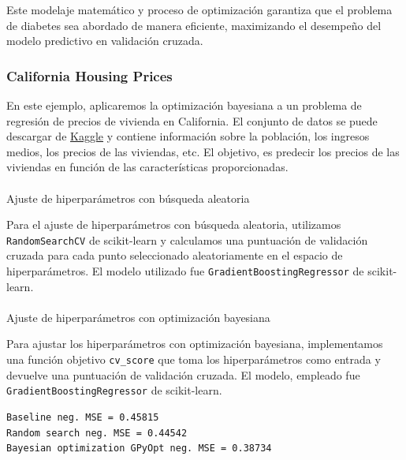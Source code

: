 \documentclass[
  12pt,
  letterpaper,
  DIV=11,
  numbers=noendperiod]{scrartcl}
\makeatletter
\let\oldparagraph\paragraph
\renewcommand{\paragraph}{
    \@ifstar
      \xxxParagraphStar
      \xxxParagraphNoStar
  }
\newcommand{\xxxParagraphStar}[1]{\oldparagraph*{#1}\mbox{}}
\newcommand{\xxxParagraphNoStar}[1]{\oldparagraph{#1}\mbox{}}
\makeatother
\begin{document}
Este modelaje matemático y proceso de optimización garantiza que el
problema de diabetes sea abordado de manera eficiente, maximizando el
desempeño del modelo predictivo en validación cruzada.

\subsubsection{California Housing
Prices}\label{california-housing-prices}

En este ejemplo, aplicaremos la optimización bayesiana a un problema de
regresión de precios de vivienda en California. El conjunto de datos se
puede descargar de
\href{https://www.kaggle.com/camnugent/california-housing-prices}{Kaggle}
y contiene información sobre la población, los ingresos medios, los
precios de las viviendas, etc. El objetivo, es predecir los precios de
las viviendas en función de las características proporcionadas.

\paragraph{Ajuste de hiperparámetros con búsqueda
aleatoria}\label{ajuste-de-hiperparuxe1metros-con-buxfasqueda-aleatoria-1}

Para el ajuste de hiperparámetros con búsqueda aleatoria, utilizamos
\texttt{RandomSearchCV} de scikit-learn y calculamos una puntuación de
validación cruzada para cada punto seleccionado aleatoriamente en el
espacio de hiperparámetros. El modelo utilizado fue
\texttt{GradientBoostingRegressor} de scikit-learn.

\paragraph{Ajuste de hiperparámetros con optimización
bayesiana}\label{ajuste-de-hiperparuxe1metros-con-optimizaciuxf3n-bayesiana-1}

Para ajustar los hiperparámetros con optimización bayesiana,
implementamos una función objetivo \texttt{cv\_score} que toma los
hiperparámetros como entrada y devuelve una puntuación de validación
cruzada. El modelo, empleado fue \texttt{GradientBoostingRegressor} de
scikit-learn.

\begin{verbatim}
Baseline neg. MSE = 0.45815
Random search neg. MSE = 0.44542
Bayesian optimization GPyOpt neg. MSE = 0.38734
\end{verbatim}
\end{document}
